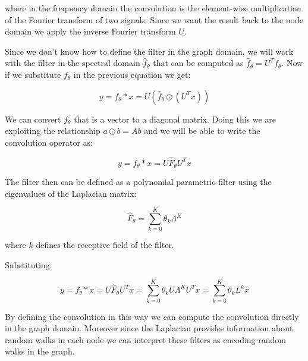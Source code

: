 where in the frequency domain the convolution is the element-wise multiplication of the Fourier transform of two signals. Since we want the result back to the node domain we apply the inverse Fourier transform $U$.

\noindent Since we don't know how to define the filter in the graph domain, we will work with the filter in the spectral domain $ \hat{f}_{\theta}$ that can be computed as $\hat{f}_{\theta} = U^T f_{\theta}$. Now if we substitute $ f_{\theta}$ in the previous equation we get:

$$ y = f_{\theta} * x = U \left(  \hat{f}_{\theta} \odot \left( U^T x \right)   \right) $$

\noindent We can convert $f_{\theta}$ that is a vector to a diagonal matrix. Doing this we are exploiting the relationship $a \odot b = Ab$ and we will be able to write the convolution operator as:

$$ y = f_{\theta} * x = U \hat{F}_{\theta} U^T x  $$

\newpage
\noindent The filter then can be defined as a polynomial parametric filter using the eigenvalues of the Laplacian matrix:

$$ \hat{F}_{\theta} = \sum_{k=0}^{K} \theta_k \Lambda^K  $$

where $k$ defines the receptive field of the filter.

\noindent Substituting:

$$ y = f_{\theta} * x = U \hat{F}_{\theta} U^T x = \sum_{k=0}^{K} \theta_k U \Lambda^K U^T x = \sum_{k=0}^{K} \theta_k L^k x$$

\noindent By defining the convolution in this way we can compute the convolution directly in the graph domain. Moreover since the Laplacian provides information about random walks in each node we can interpret these filters as encoding random walks in the graph. 

